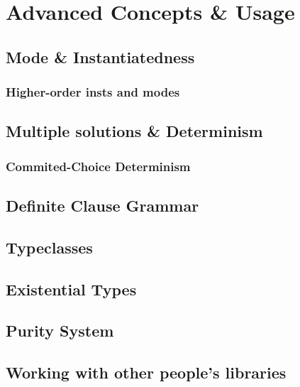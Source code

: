 \chapter{Advanced Concepts \& Usage}

\section{Mode \& Instantiatedness}

\subsection{Higher-order insts and modes}

\section{Multiple solutions \& Determinism}

\subsection{Commited-Choice Determinism}

\section{Definite Clause Grammar}

\section{Typeclasses}

\section{Existential Types}

\section{Purity System}

\section{Working with other people's libraries}


